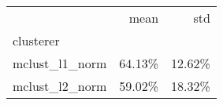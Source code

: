 \begin{tabular}{lrr}
\toprule
{} &   mean &    std \\
clusterer      &        &        \\
\midrule
mclust\_l1\_norm & 64.13\% & 12.62\% \\
mclust\_l2\_norm & 59.02\% & 18.32\% \\
\bottomrule
\end{tabular}

